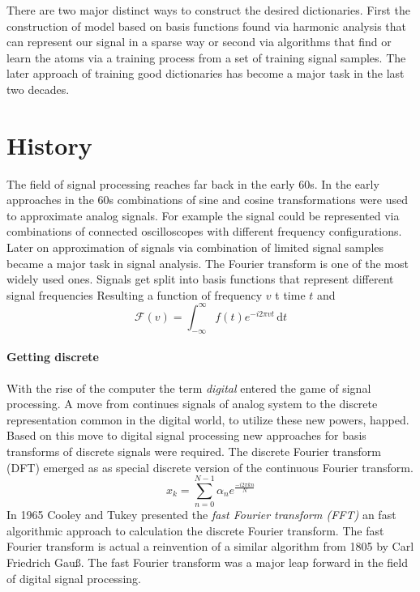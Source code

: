 There are two major distinct ways to construct the desired dictionaries. First
the construction of model based on basis functions found via harmonic analysis
that can represent our signal in a sparse way or second via algorithms that find
or learn the atoms via a training process from a set of training signal samples.
The later approach of training good dictionaries has become a major task in the
last two decades\cite{Mairal2010}.




\section{History}
\label{sec:history}
The field of signal processing reaches far back in the early 60s.
\cite{Rubinstein2010}
In the early approaches in the 60s combinations of sine and cosine
transformations were used to approximate analog signals. For example the signal
could be represented via combinations of connected oscilloscopes with different
frequency configurations. Later on approximation of signals via combination of
limited signal samples became a major task in signal analysis.  The Fourier
transform is one of the most widely used ones. Signals get split into basis
functions that represent different signal frequencies 
Resulting a function of frequency $v$ t time $t$ and
\begin{equation*}
\mathcal{F}\left(v\right) = \int_{-\infty}^{\infty} \! f(t)e^{-i2\pi vt} \,
\mathrm{d}t
\end{equation*}

\paragraph{Getting discrete}
With the rise of the computer the term \emph{digital} entered the
game of signal processing. A move from continues signals of analog system to the
discrete representation common in the digital world, to utilize these new
powers, happed. Based on this move to digital signal processing new
approaches for basis transforms of discrete signals were required. The discrete
Fourier transform (DFT) emerged as as special discrete version of the continuous
Fourier transform.
\begin{equation*}
 x_k = \sum_{n=0}^{N-1}\alpha_ne^{\frac{-i2\pi kn}{N}}
\end{equation*}
In 1965 Cooley and Tukey presented\cite{Cooley1965} the \emph{fast Fourier
transform (FFT)} an fast algorithmic approach to calculation the discrete
Fourier transform. The fast Fourier transform is actual a reinvention of a
similar algorithm from 1805 by Carl Friedrich Gauß. The fast Fourier transform
was a major leap forward in the field of digital signal processing.


